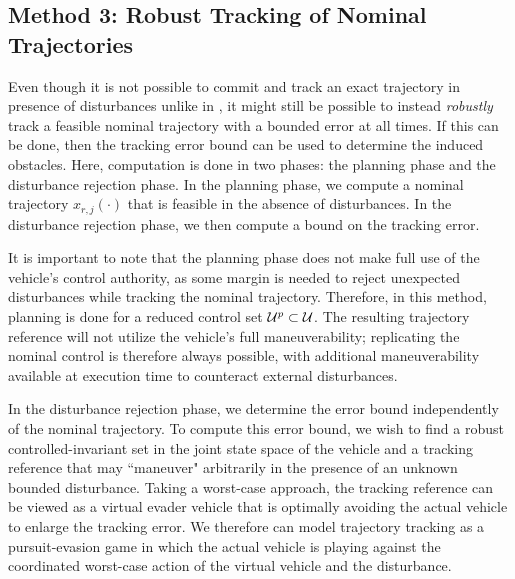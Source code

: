 \subsection{Method 3: Robust Tracking of Nominal Trajectories \label{sec:rtt}}
Even though it is not possible to commit and track an exact trajectory in presence of disturbances unlike in \cite{Chen15}, it might still be possible to instead \textit{robustly} track a feasible nominal trajectory with a bounded error at all times. If this can be done, then the tracking error bound can be used to determine the induced obstacles. Here, computation is done in two phases: the planning phase and the disturbance rejection phase. In the planning phase, we compute a nominal trajectory $x_{r,j}(\cdot)$ that is feasible in the absence of disturbances. In the disturbance rejection phase, we then compute a bound on the tracking error.%

It is important to note that the planning phase does not make full use of the vehicle's control authority, as some margin is needed to reject unexpected disturbances while tracking the nominal trajectory. Therefore, in this method, planning is done for a reduced control set $\mathcal{U}^p\subset\mathcal{U}$. The resulting trajectory reference will not utilize the vehicle's full maneuverability; replicating the nominal control is therefore always possible, with additional maneuverability available at execution time to counteract external disturbances.

In the disturbance rejection phase, we determine the error bound independently of the nominal trajectory. To compute this error bound, we wish to find a robust controlled-invariant set in the joint state space of the vehicle and a tracking reference that may ``maneuver" arbitrarily in the presence of an unknown bounded disturbance. Taking a worst-case approach, the tracking reference can be viewed as a virtual evader vehicle that is optimally avoiding the actual vehicle to enlarge the tracking error. We therefore can model trajectory tracking as a pursuit-evasion game in which the actual vehicle is playing against the coordinated worst-case action of the virtual vehicle and the disturbance. %


